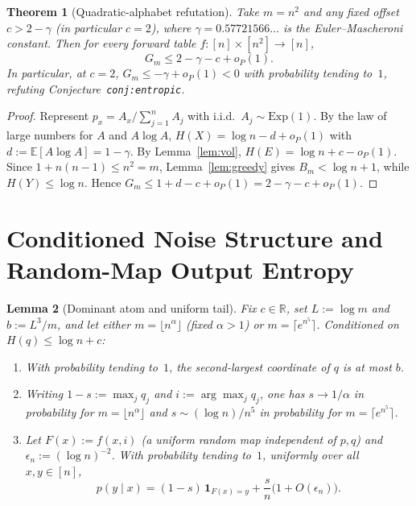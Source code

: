\documentclass[11pt]{article}
\theoremstyle{plain}
\newtheorem{theorem}{Theorem}
\newtheorem{lemma}[theorem]{Lemma}
\theoremstyle{definition}
\theoremstyle{remark}
\begin{document}
\begin{theorem}[Quadratic-alphabet refutation]\label{thm:quad}
Take $m = n^2$ and any fixed offset $c > 2 - \gamma$ (in particular $c = 2$), where $\gamma = 0.57721566\dots$ is the Euler--Mascheroni constant. Then for every forward table $f : [n] \times [n^2] \to [n]$,
\[
G_m \le 2 - \gamma - c + o_P(1).
\]
In particular, at $c = 2$, $G_m \le -\gamma + o_P(1) < 0$ with probability tending to~$1$, refuting Conjecture~\texttt{conj:entropic}.
\end{theorem}

\begin{proof}
Represent $p_x = A_x / \sum_{j=1}^n A_j$ with i.i.d.\ $A_j \sim \mathrm{Exp}(1)$. By the law of large numbers for $A$ and $A \log A$, $H(X) = \log n - d + o_P(1)$ with $d := \mathbb{E}[A \log A] = 1 - \gamma$. By Lemma~\ref{lem:vol}, $H(E) = \log n + c - o_P(1)$. Since $1 + n(n-1) \le n^2 = m$, Lemma~\ref{lem:greedy} gives $B_m < \log n + 1$, while $H(Y) \le \log n$. Hence $G_m \le 1 + d - c + o_P(1) = 2 - \gamma - c + o_P(1)$.
\end{proof}

\section{Conditioned Noise Structure and Random-Map Output Entropy}

\begin{lemma}[Dominant atom and uniform tail]\label{lem:noise}
Fix $c \in \mathbb{R}$, set $L := \log m$ and $b := L^3 / m$, and let either $m = \lfloor n^\alpha \rfloor$ (fixed $\alpha > 1$) or $m = \lceil e^{n^5} \rceil$. Conditioned on $H(q) \le \log n + c$:
\begin{enumerate}[label=\textup{(\arabic*)}]
\item With probability tending to~$1$, the second-largest coordinate of $q$ is at most $b$.
\item Writing $1 - s := \max_j q_j$ and $i := \arg\max_j q_j$, one has $s \to 1/\alpha$ in probability for $m = \lfloor n^\alpha \rfloor$ and $s \sim (\log n)/n^5$ in probability for $m = \lceil e^{n^5} \rceil$.
\item Let $F(x) := f(x, i)$ (a uniform random map independent of $p, q$) and $\epsilon_n := (\log n)^{-2}$. With probability tending to~$1$, uniformly over all $x, y \in [n]$,
\begin{equation}\label{eq:channel}
p(y \mid x) = (1 - s)\,\mathbf{1}_{F(x) = y} + \frac{s}{n}\bigl(1 + O(\epsilon_n)\bigr).
\end{equation}
\end{enumerate}
\end{lemma}
\end{document}
